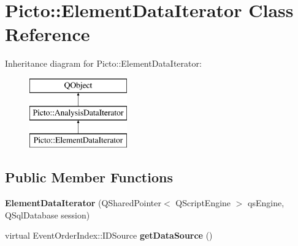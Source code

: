 \hypertarget{class_picto_1_1_element_data_iterator}{\section{Picto\-:\-:Element\-Data\-Iterator Class Reference}
\label{class_picto_1_1_element_data_iterator}
}
Inheritance diagram for Picto\-:\-:Element\-Data\-Iterator\-:\begin{figure}[H]
\begin{center}
\leavevmode
\includegraphics[height=3.000000cm]{class_picto_1_1_element_data_iterator}
\end{center}
\end{figure}
\subsection*{Public Member Functions}
\begin{DoxyCompactItemize}
\item 
\hypertarget{class_picto_1_1_element_data_iterator_a7d530000f08b353a2b2f90ec02beb62a}{{\bfseries Element\-Data\-Iterator} (Q\-Shared\-Pointer$<$ Q\-Script\-Engine $>$ qs\-Engine, Q\-Sql\-Database session)}\label{class_picto_1_1_element_data_iterator_a7d530000f08b353a2b2f90ec02beb62a}

\item 
\hypertarget{class_picto_1_1_element_data_iterator_a88bdffe7a184a93b2729c5729dde361e}{virtual Event\-Order\-Index\-::\-I\-D\-Source {\bfseries get\-Data\-Source} ()}\label{class_picto_1_1_element_data_iterator_a88bdffe7a184a93b2729c5729dde361e}

\end{DoxyCompactItemize}
